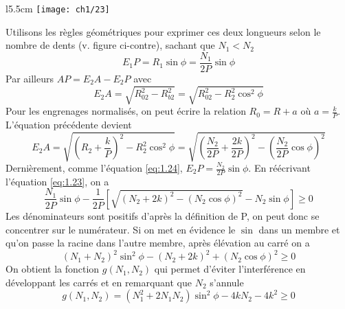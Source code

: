 	\begin{wrapfigure}[7]{l}{5.5cm}
	\vspace{-10mm}
	\texttt{[image: ch1/23]}
	\end{wrapfigure}				 
	Utilisons les règles géométriques pour exprimer ces deux longueurs selon le nombre de dents (v. figure ci-contre), sachant que $N_1<N_2$
	\begin{equation}
		E_1P = R_1\sin \phi = \frac{N_1}{2P}\sin \phi 
		\label{eq:1.24}
	\end{equation}
	Par ailleurs $AP = E_2A - E_2P$ avec 
	\begin{equation}
		E_2A = \sqrt{R_{02}^2-R_{b2}^2} = \sqrt{R_{02}^2-R_{2}^2\cos ^2 \phi}
	\end{equation}
	Pour les engrenages normalisés, on peut écrire la relation $R_0 = R+a$ où $a=\frac{k}{P}$. L'équation précédente devient
	\begin{equation}
	E_2A= \sqrt{\left( R_2+\frac{k}{P} \right)^2-R_{2}^2\cos ^2 \phi} = \sqrt{\left( \frac{N_2}{2P}+\frac{2k}{2P} \right)^2-\left( \frac{N_2}{2P}\cos \phi \right) ^2}
	\end{equation}
	Dernièrement, comme l'équation \autoref{eq:1.24}, $E_2P = \frac{N_2}{2P}\sin \phi$. En réécrivant l'équation \autoref{eq:1.23}, on a 
	\begin{equation}
		\frac{N_1}{2P}\sin \phi - \frac{1}{2P}\left[ \sqrt{(N_2 + 2k)^2 - (N_2 \cos \phi )^2} - N_2 \sin \phi \right] \geq 0
	\end{equation}
	Les dénominateurs sont positifs d'après la définition de P, on peut donc se concentrer sur le numérateur. Si on met en évidence le $\sin$ dans un membre et qu'on passe la racine dans l'autre membre, après élévation au carré on a 
	\begin{equation}
		(N_1+N_2)^2\sin ^2 \phi - (N_2+2k)^2 + (N_2\cos \phi)^2 \geq 0
	\end{equation}
	On obtient la fonction $g(N_1,N_2)$ qui permet d'éviter l'interférence en développant les carrés et en remarquant que $N_2$ s'annule
	\begin{equation}
		g(N_1,N_2) = (N_1^2 + 2N_1N_2)\sin ^2 \phi - 4kN_2 - 4k^2  \geq 0
		\label{eq:1.29}
	\end{equation}
	
